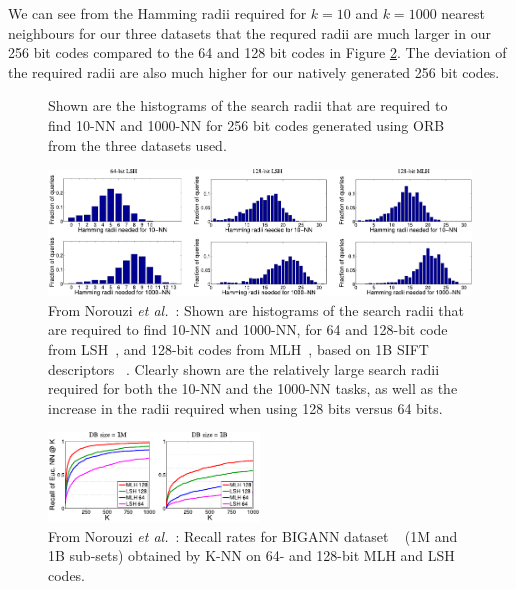 We can see from the Hamming radii required for $k=10$ and $k=1000$ nearest neighbours for our three datasets that the requred radii are much larger in our 256 bit codes compared to the 64 and 128 bit codes in Figure \ref{fig:radii}. The deviation of the required radii are also much higher for our natively generated 256 bit codes.

\begin{figure}[H]
\figfont
 
\centering
{}
\caption{Shown are the histograms of the search radii that are required to find 10-NN and 1000-NN for 256 bit codes generated using ORB from the three datasets used.}
\label{fig:radii256}
\end{figure}

\begin{figure}[H]
\centering
\includegraphics[width=1\textwidth]{radii64-128.pdf} 
\caption{From Norouzi \emph{et al.}~\cite{norouzi2012fast}: Shown are histograms  of the search radii that are required to find 10-NN and 1000-NN, for 64 and 128-bit code from LSH~\cite{andoni2006near}, and 128-bit codes from MLH~\cite{norouzi2011minimal}, based on 1B SIFT descriptors ~\cite{jegou2011searching}. Clearly shown are the relatively large search radii required for both the 10-NN and the 1000-NN tasks, as well as the increase in the radii required when using 128 bits versus 64 bits.
}
\label{fig:radii}
\end{figure}


\begin{figure}[p]
\figfont
\centering
\captionsetup{width=10cm}
\caption{From Norouzi \emph{et al.}~\cite{norouzi2012fast}: Recall rates for BIGANN dataset ~\cite{jegou2011searching} (1M and 1B sub-sets) obtained by K-NN on 64- and 128-bit MLH and LSH codes.}
\label{fig:hashmatching}
\includegraphics[width=0.5\textwidth]{LSH-MLH.pdf}
\end{figure}